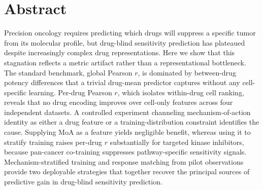 \section*{Abstract}

\noindent Precision oncology requires predicting which drugs will suppress a specific tumor from its molecular profile, but drug-blind sensitivity prediction has plateaued despite increasingly complex drug representations. Here we show that this stagnation reflects a metric artifact rather than a representational bottleneck. The standard benchmark, global Pearson $r$, is dominated by between-drug potency differences that a trivial drug-mean predictor captures without any cell-specific learning. Per-drug Pearson $r$, which isolates within-drug cell ranking, reveals that no drug encoding improves over cell-only features across four independent datasets. A controlled experiment channeling mechanism-of-action identity as either a drug feature or a training-distribution constraint identifies the cause. Supplying MoA as a feature yields negligible benefit, whereas using it to stratify training raises per-drug $r$ substantially for targeted kinase inhibitors, because pan-cancer co-training suppresses pathway-specific sensitivity signals. Mechanism-stratified training and response matching from pilot observations provide two deployable strategies that together recover the principal sources of predictive gain in drug-blind sensitivity prediction.


